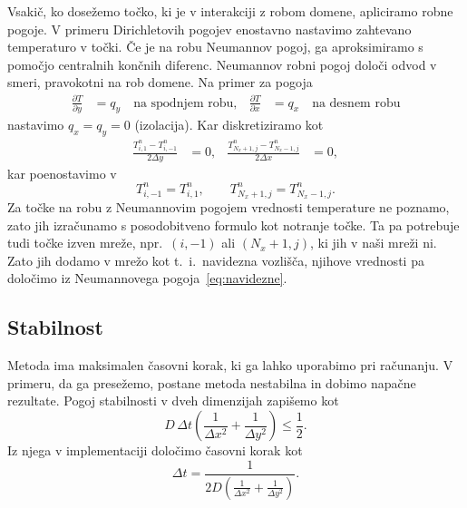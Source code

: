 \documentclass[a4paper,11pt]{article}
\begin{document}
	Vsakič, ko dosežemo točko, ki je v interakciji z robom domene, apliciramo robne pogoje. V primeru Dirichletovih pogojev enostavno nastavimo zahtevano temperaturo v točki. Če je na robu Neumannov pogoj, ga aproksimiramo s pomočjo centralnih končnih diferenc. Neumannov robni pogoj določi odvod v smeri, pravokotni na rob domene. Na primer za pogoja
	\begin{align*}
		\frac{\partial T}{\partial y} &= q_y \quad \text{na spodnjem robu}, &
		\frac{\partial T}{\partial x} &= q_x \quad \text{na desnem robu}
	\end{align*}
	nastavimo $q_x = q_y = 0$ (izolacija). Kar diskretiziramo kot
	\begin{align*}
		\frac{T^n_{i,1} - T^n_{i,-1}}{2\Delta y} &= 0, &
		\frac{T^n_{N_x+1,j} - T^n_{N_x-1,j}}{2\Delta x} &= 0,
	\end{align*}
	kar poenostavimo v
	\begin{equation}
		T^n_{i,-1} = T^n_{i,1}, \qquad T^n_{N_x+1,j} = T^n_{N_x-1,j}.
		\label{eq:navidezne}
	\end{equation}
	Za točke na robu z Neumannovim pogojem vrednosti temperature ne poznamo, zato jih izračunamo s posodobitveno formulo kot notranje točke. Ta pa potrebuje tudi točke izven mreže, npr.\ $(i, -1)$ ali $(N_x+1, j)$, ki jih v naši mreži ni. Zato jih dodamo v mrežo kot t.~i.\ navidezna vozlišča, njihove vrednosti pa določimo iz Neumannovega pogoja~\eqref{eq:navidezne}.
	
	\subsection{Stabilnost}
	
	Metoda ima maksimalen časovni korak, ki ga lahko uporabimo pri računanju. V primeru, da ga presežemo, postane metoda nestabilna in dobimo napačne rezultate. Pogoj stabilnosti v dveh dimenzijah zapišemo kot
	\begin{equation}
		D\,\Delta t \left(\frac{1}{\Delta x^2} + \frac{1}{\Delta y^2}\right) \leq \frac{1}{2}.
		\label{eq:stabilnost}
	\end{equation}
	Iz njega v implementaciji določimo časovni korak kot
	\begin{equation}
		\Delta t = \frac{1}{2D\left(\frac{1}{\Delta x^2} + \frac{1}{\Delta y^2}\right)}.
	\end{equation}
	
\end{document}
